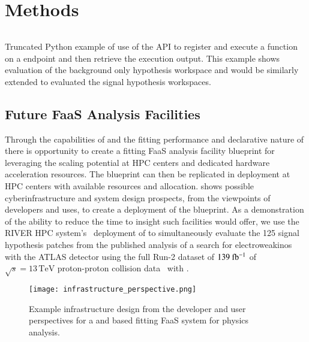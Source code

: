 \section{Methods}\label{sec:methods}
%

%


\begin{listing}
 \inputminted{python}{src/code/funcX_registration_example.py}
 \caption{Truncated Python example of use of the \funcX{} API to register and execute a \pyhf{} function on a \funcX{} endpoint and then retrieve the execution output.
 This example shows evaluation of the background only hypothesis workspace and would be similarly extended to evaluated the signal hypothesis workspaces.}
 \label{lst:funcX_registration_example}
\end{listing}

\subsection{Future FaaS Analysis Facilities}\label{subsec:FaaS_analysis_facilities}

Through the capabilities of \funcX{} and the fitting performance and declarative nature of \pyhf{} there is opportunity to create a fitting FaaS analysis facility blueprint for leveraging the scaling potential at HPC centers and dedicated hardware acceleration resources.
The blueprint can then be replicated in deployment at HPC centers with available resources and allocation.
 shows possible cyberinfrastructure and system design prospects, from the viewpoints of developers and uses, to create a deployment of the blueprint.
As a demonstration of the ability to reduce the time to insight such facilities would offer, we use the RIVER HPC system's~\cite{RIVER_HPC} deployment of \funcX{} to simultaneously evaluate the 125 signal hypothesis patches from the published analysis of a search for electroweakinos with the ATLAS detector using the full Run-2 dataset of \(139~\ifb\) of \(\sqrt{s} = 13\,\text{TeV}\) proton-proton collision data~\cite{SUSY-2019-08} with \pyhf{}.

\begin{figure}[!htpb]
    \centering
    \texttt{[image: infrastructure\_perspective.png]}
    \caption{Example infrastructure design from the developer and user perspectives for a \pyhf{} and \funcX{} based fitting FaaS system for physics analysis.~\cite{portable_inference_workshop}}
    \label{fig:infrastructure_perspective}
\end{figure}
